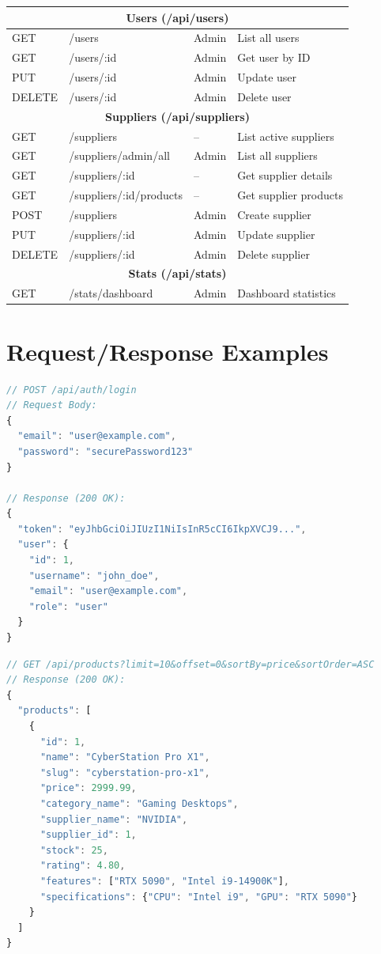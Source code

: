 \documentclass[12pt,a4paper]{report}
\begin{document}
\begin{longtable}{|l|l|l|p{4cm}|}
\multicolumn{4}{|c|}{\textbf{Users (/api/users)}} \\
\hline
GET & /users & Admin & List all users \\
GET & /users/:id & Admin & Get user by ID \\
PUT & /users/:id & Admin & Update user \\
DELETE & /users/:id & Admin & Delete user \\
\hline

\multicolumn{4}{|c|}{\textbf{Suppliers (/api/suppliers)}} \\
\hline
GET & /suppliers & -- & List active suppliers \\
GET & /suppliers/admin/all & Admin & List all suppliers \\
GET & /suppliers/:id & -- & Get supplier details \\
GET & /suppliers/:id/products & -- & Get supplier products \\
POST & /suppliers & Admin & Create supplier \\
PUT & /suppliers/:id & Admin & Update supplier \\
DELETE & /suppliers/:id & Admin & Delete supplier \\
\hline

\multicolumn{4}{|c|}{\textbf{Stats (/api/stats)}} \\
\hline
GET & /stats/dashboard & Admin & Dashboard statistics \\
\hline

\end{longtable}

\section{Request/Response Examples}

\begin{lstlisting}[language=JavaScript, caption={Login API -- Request and Response}]
// POST /api/auth/login
// Request Body:
{
  "email": "user@example.com",
  "password": "securePassword123"
}

// Response (200 OK):
{
  "token": "eyJhbGciOiJIUzI1NiIsInR5cCI6IkpXVCJ9...",
  "user": {
    "id": 1,
    "username": "john_doe",
    "email": "user@example.com",
    "role": "user"
  }
}
\end{lstlisting}

\begin{lstlisting}[language=JavaScript, caption={Products API -- List Response}]
// GET /api/products?limit=10&offset=0&sortBy=price&sortOrder=ASC
// Response (200 OK):
{
  "products": [
    {
      "id": 1,
      "name": "CyberStation Pro X1",
      "slug": "cyberstation-pro-x1",
      "price": 2999.99,
      "category_name": "Gaming Desktops",
      "supplier_name": "NVIDIA",
      "supplier_id": 1,
      "stock": 25,
      "rating": 4.80,
      "features": ["RTX 5090", "Intel i9-14900K"],
      "specifications": {"CPU": "Intel i9", "GPU": "RTX 5090"}
    }
  ]
}
\end{lstlisting}
\end{document}

